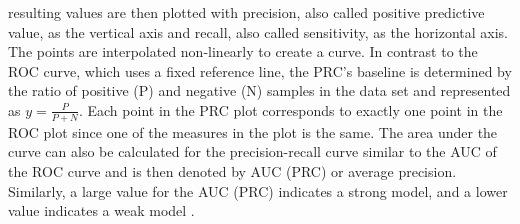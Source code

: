 resulting values are then plotted with precision, also called positive 
predictive value, as the vertical axis and recall, also called sensitivity, as 
the horizontal axis. The points are interpolated non-linearly to create a 
curve. 
In contrast to the ROC curve, which uses a fixed reference line, the PRC's 
baseline is determined by the ratio of positive (P) and negative (N) samples in 
the data set and represented as $y = \frac{P}{P + N}$. Each point in the PRC 
plot corresponds to exactly one point in the ROC plot since one of the measures 
in the plot is the same. The area under the curve can also be 
calculated for the precision-recall curve similar to the AUC of the ROC curve 
and is then denoted by AUC (PRC) or average precision. Similarly, a large value 
for the AUC (PRC) indicates a strong model, and a lower value indicates a weak 
model \cite{RN160, RN161}.
